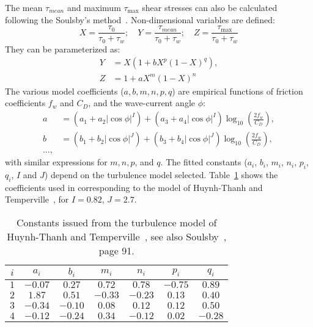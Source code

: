The mean $\tau_{mean}$ and maximum $\tau_{\max}$ shear stresses can
also be calculated following the Soulsby's method~\cite{Soulsby}. Non-dimensional
variables are defined:
\begin{equation*}
X=\frac{\tau_0}{\tau_0+\tau_w};\quad Y=\frac{\tau_{mean}}{\tau_0+\tau_w};\quad  
Z=\frac{\tau_{\max}}{\tau_0+\tau_w} 
\end{equation*}
They can be parameterized as:
\begin{align*}
Y &= X\left(1+bX^p(1-X)^q\right),\\
Z &= 1+aX^m(1-X)^n 
\end{align*}
The various model coefficients ($a, b, m, n, p, q$) are empirical functions of
friction coefficients $f_w$ and $C_D$, and the wave-current angle $\phi$:
\begin{align*}
a &= (a_1 +a_2 \left|\cos \phi \right|^I)+(a_3+a_4 \left|\cos
\phi \right|^I)\log_{10}\left(\frac{2f_w}{C_D} \right),\\
b &= (b_1 +b_2 \left|\cos \phi \right|^J)+(b_3+b_4 \left|\cos
\phi \right|^J)\log_{10} \left(\frac{2f_w}{C_D } \right),\\
..., &   
\end{align*}
with similar expressions for $m, n, p$, and $q$. The fitted constants ($a_i$, $b_i$, $m_i$, $n_i$, $p_i$, $q_i$, $I$ and $J$) depend on the turbulence model selected. Table~\ref{tab:constants} shows the coefficients used in \sisyphe corresponding to the model of Huynh-Thanh and Temperville~\cite{Huynh}, for $I = 0.82$, $J = 2.7$.

\begin{table}[H]
 \centering
\begin{tabular}{ccccccc}
\hline
$i$  & $a_i$ & $b_i$ & $m_i$ & $n_i$ & $p_i$ & $q_i$ \\
\hline
$1$ & $-0.07$ &  $0.27$ & $0.72$ & $0.78$ & $-0.75$ & $0.89$ \\
$2$ & $1.87$ & $0.51$ & $-0.33$ & $-0.23$ & $0.13$ & $0.40$ \\
$3$ & $-0.34$ & $-0.10$ & $0.08$ & $0.12$ & $0.12$ & $0.50$ \\
$4$ & $-0.12$ & $-0.24$ & $0.34$ & $-0.12$ & $0.02$ & $-0.28$ \\
\hline
 \end{tabular}
\caption{Constants issued from the turbulence model of Huynh-Thanh and Temperville~\cite{Huynh}, see also Soulsby~\cite{Soulsby}, page 91.}
  \label{tab:constants}
\end{table}

